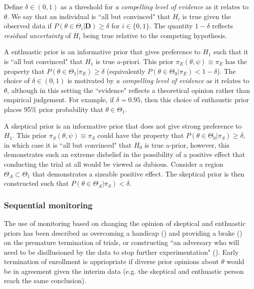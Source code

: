 \documentclass[12pt]{article}
\begin{document}
Define $\delta\in(0,1)$ as a threshold for \textit{a compelling level of evidence} as it relates to $\theta$. We say that an individual is ``all but convinced" that $H_i$ is true given the observed data if $P(\theta\in\Theta_i|\mathbf{D})\geq\delta$ for $i\in\{0,1\}$. The quantity $1-\delta$ reflects \textit{residual uncertainty} of $H_i$ being true relative to the competing hypothesis. %


A enthuastic prior is an informative prior that gives preference to $H_1$ such that it is ``all but convinced" that $H_1$ is true a-priori. This prior $\pi_{E}(\theta,\psi)\equiv\pi_{E}$ has the property that $P(\theta\in\Theta_1| \pi_{E})\geq\delta$ (equivalently $P(\theta\in\Theta_0| \pi_{E})<1-\delta$). The choice of $\delta\in(0,1)$ is motivated by \textit{a compelling level of evidence} as it relates to $\theta$, although in this setting the ``evidence" reflects a theoretical opinion rather than empirical judgement. For example, if $\delta=0.95$, then this choice of enthaustic prior places 95\% prior probability that $\theta\in\Theta_1$.  

A skeptical prior is an informative prior that does not give strong preference to $H_1$. This prior $\pi_{S}(\theta,\psi)\equiv\pi_{S}$ could have the property that $P(\theta\in\Theta_0| \pi_{S})\geq\delta$, in which case it is ``all but convinced" that $H_0$ is true a-prior, however, this demonstrates such an extreme disbelief in the possibility of a positive effect that conducting the trial at all would be viewed as dubious. Consider a region $\Theta_A\subset\Theta_1$ that demonstrates a sizeable positive effect. The skeptical prior is then constructed such that $P(\theta\in\Theta_A| \pi_{S})<\delta$.

\subsubsection{Sequential monitoring}
The use of monitoring based on changing the opinion of skeptical and enthuastic priors has been described as overcoming a handicap (\cite{Freedman1989}) and providing a brake (\cite{Fayers1997}) on the premature termination of trials, or constructing ``an adversary who will need to be disillusioned by the data to stop further experimentation" (\cite{Spiegelhalter1994}). Early termination of enrollment is appriopriate if diverse prior opinions about $\theta$ would be in agreement given the interim data (e.g. the skeptical and enthuastic person reach the same conclusion). 
\end{document}
